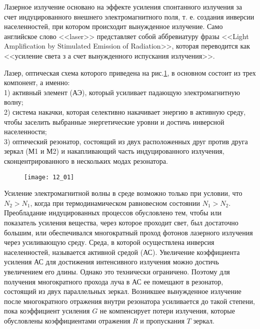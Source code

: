
Лазерное излучение основано на эффекте усиления спонтанного излучения за 
счет индуцированного внешнего электромагнитного поля, т. е. создания инверсии 
населенностей, при котором происходит вынужденное излучение. Само английское 
слово <<laser>> представляет собой аббревиатуру фразы <<Light Amplification by 
Stimulated Emission of Radiation>>, которая переводится как <<усиление света з
а счет вынужденного испускания излучения>>.

Лазер, оптическая схема которого приведена на рис.\ref{img12.1}, в основном
состоит из трех компонент, а именно: \\
1) активный элемент (АЭ), который усиливает падающую электромагнитную волну; \\
2) система накачки, которая селективно накачивает энергию в активную среду, 
чтобы заселить выбранные энергетические уровни и достичь инверсной 
населенности; \\
3) оптический резонатор, состоящий из двух расположенных друг против друга 
зеркал (М1 и М2) и накапливающий часть индуцированного излучения, 
сконцентрированного в нескольких модах резонатора. 

\begin{figure}[h!]
    \center
    \texttt{[image: 12\_01]}
    \label{img12.1}
\end{figure}

Усиление электромагнитной волны в среде возможно только при условии, что 
\( N_2 > N_1 \), когда при термодинамическом равновесном состоянии 
\( N_1 > N_2 \). Преобладание индуцированных процессов обусловлено тем, чтобы 
или показатель усиления вещества, через которое проходит свет, был достаточно 
большим, или обеспечивался многократный проход фотонов лазерного излучения 
через усиливающую среду. Среда, в которой осуществлена инверсия населенностей, 
называется активной средой (АС). Увеличение коэффициента усиления АС для 
достижения интенсивного излучения можно достичь увеличением его длины. Однако 
это технически ограничено. Поэтому для получения многократного прохода луча в 
АС ее помещают в резонатор, состоящий из двух параллельных зеркал. Возникшее 
вынужденное излучение после многократного отражения внутри резонатора 
усиливается до такой степени, пока коэффициент усиления \( G \) не 
компенсирует потери излучения, которые обусловлены коэффициентами 
отражения \( R \) и пропускания \( T \) зеркал.

